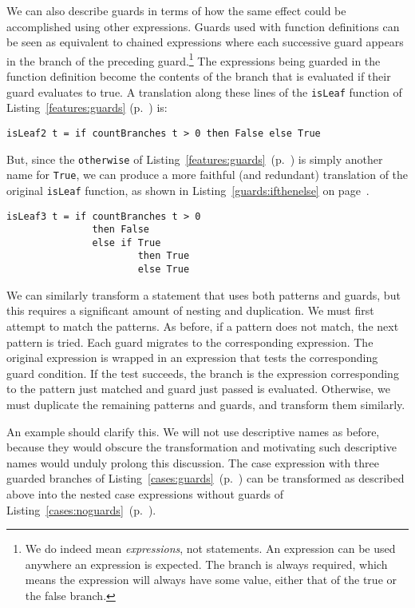 We can also describe guards in terms of how the same effect could be accomplished using other expressions. Guards used with function definitions can be seen as equivalent to chained  expressions where each successive guard appears in the  branch of the preceding guard.\footnote{We do indeed mean  \emph{expressions}, not  statements. An  expression can be used anywhere an expression is expected. The  branch is always required, which means the expression will always have some value, either that of the true or the false branch.} The expressions being guarded in the function definition become the contents of the  branch that is evaluated if their guard evaluates to true. A translation along these lines of the \lstinline{isLeaf} function of Listing~\ref{features:guards} (p.~\pageref{features:guards}) is:
\begin{lstlisting}
isLeaf2 t = if countBranches t > 0 then False else True
\end{lstlisting}
But, since the \lstinline{otherwise} of Listing~\ref{features:guards}~(p.~\pageref{features:guards}) is simply another name for \lstinline{True}, we can produce a more faithful (and redundant) translation of the original \lstinline{isLeaf} function, as shown in Listing~\ref{guards:ifthenelse} on page~\pageref{guards:ifthenelse}.

\begin{lstlisting}[float,caption={Guards as chained if-then-else--expressions},label={guards:ifthenelse}]
isLeaf3 t = if countBranches t > 0
               then False
               else if True 
                       then True  
                       else True
\end{lstlisting}

We can similarly transform a  statement that uses both patterns and guards, but this requires a significant amount of nesting and duplication. We must first attempt to match the patterns. As before, if a pattern does not match, the next pattern is tried. Each guard migrates to the corresponding expression. The original expression is wrapped in an  expression that tests the corresponding guard condition. If the test succeeds, the  branch is the expression corresponding to the pattern just matched and guard just passed is evaluated. Otherwise, we must duplicate the remaining patterns and guards, and transform them similarly.

An example should clarify this. We will not use descriptive names as before, because they would obscure the transformation and motivating such descriptive names would unduly prolong this discussion. The case expression with three guarded branches of Listing~\ref{cases:guards}~(p.~\pageref{cases:guards}) can be transformed as described above into the nested case expressions without guards of Listing~\ref{cases:noguards}~(p.~\pageref{cases:noguards}).

